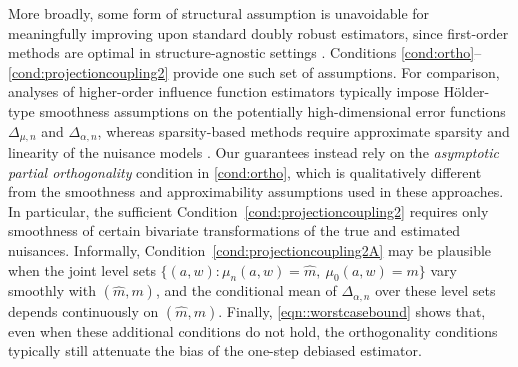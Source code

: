 \documentclass[11pt]{article}
\theoremstyle{plain}
\begin{document}
More broadly, some form of structural assumption is unavoidable for
meaningfully improving upon standard doubly robust estimators, since
first-order methods are optimal in structure-agnostic settings
\citep{balakrishnan2023fundamental, jin2025sharp}. Conditions
\ref{cond:ortho}--\ref{cond:projectioncoupling2} provide one such set of
assumptions. For comparison, analyses of higher-order influence function
estimators \citep{robins2008higher} typically impose H\"older-type smoothness
assumptions on the potentially high-dimensional error functions
\(\Delta_{\mu,n}\) and \(\Delta_{\alpha,n}\), whereas sparsity-based methods
require approximate sparsity and linearity of the nuisance models
\citep{liu2023root}. Our guarantees instead rely on the \emph{asymptotic
partial orthogonality} condition in \ref{cond:ortho}, which is qualitatively
different from the smoothness and approximability assumptions used in these
approaches. In particular, the sufficient Condition~\ref{cond:projectioncoupling2}
requires only smoothness of certain bivariate transformations of the true and
estimated nuisances. Informally, Condition~\ref{cond:projectioncoupling2A} may be
plausible when the joint level sets
\(\{(a,w): \mu_n(a,w)=\widehat m,\ \mu_0(a,w)=m\}\) vary smoothly with
\((\widehat m,m)\), and the conditional mean of \(\Delta_{\alpha,n}\) over
these level sets depends continuously on \((\widehat m,m)\). Finally,  \eqref{eqn::worstcasebound} shows that, even when these additional
conditions do not hold, the orthogonality conditions typically still attenuate
the bias of the one-step debiased estimator.
 
  

\end{document}
